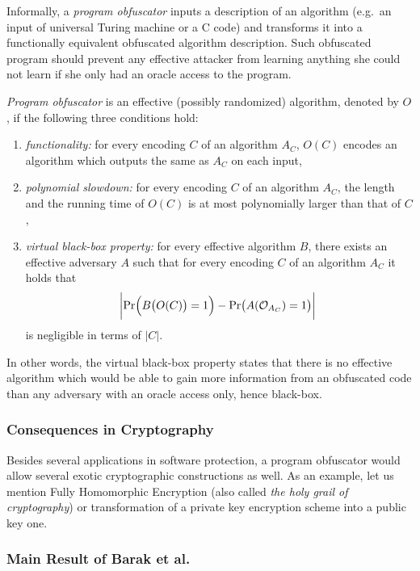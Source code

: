 	Informally, a {\em program obfuscator} inputs a description of an algorithm (e.g.\ an input of universal Turing machine or a C code) and transforms it into a functionally equivalent obfuscated algorithm description. Such obfuscated program should prevent any effective attacker from learning anything she could not learn if she only had an oracle access to the program.
	
	\begin{defn}
	\label{def:obfus}
		{\em Program obfuscator} is an effective (possibly randomized) algorithm, denoted by $O$, if the following three conditions hold:
		\begin{enumerate}
			\item {\em functionality:} for every encoding $C$ of an algorithm $A_C$, $O(C)$ encodes an algorithm which outputs the same as $A_C$ on each input,
			\item {\em polynomial slowdown:} for every encoding $C$ of an algorithm $A_C$, the length and the running time of $O(C)$ is at most polynomially larger than that of $C$,
			\item {\em virtual black-box property:} for every effective algorithm $B$, there exists an effective adversary $A$ such that for every encoding $C$ of an algorithm $A_C$ it holds that
			\[
				\biggl| \Pr\Bigl(B\bigl(O(C)\bigr)=1\Bigr) - \Pr\bigl(A({\cal O}_{A_C})=1\bigr) \biggr| \
			\]
			is negligible in terms of $|C|$.
		\end{enumerate}
	\end{defn}
	
	In other words, the virtual black-box property states that there is no effective algorithm which would be able to gain more information from an obfuscated code than any adversary with an oracle access only, hence black-box.

\subsubsection{Consequences in Cryptography}
	
	Besides several applications in software protection, a program obfuscator would allow several exotic cryptographic constructions as well. As an example, let us mention Fully Homomorphic Encryption (also called {\em the holy grail of cryptography}) or transformation of a private key encryption scheme into a public key one.

\subsubsection{Main Result of Barak et al.}
	
